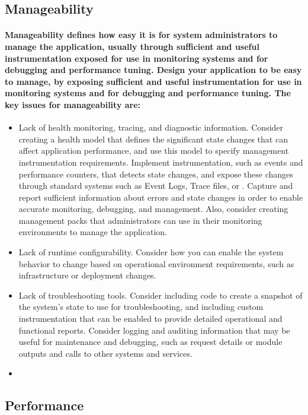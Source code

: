 \documentclass[../Psychological_system_web_application.tex]{subfiles}
\begin{document}
			\subsection{Manageability}
			
				\paragraph{\gls{Manageability} defines how easy it is for system administrators to manage the application, usually through sufficient and useful instrumentation exposed for use in monitoring systems and for debugging and performance tuning. Design your application to be easy to manage, by exposing sufficient and useful instrumentation for use in monitoring systems and for debugging and performance tuning. The key issues for manageability are:}
				
				\begin{itemize}
					\item
						Lack of health monitoring, tracing, and diagnostic information. Consider creating a health model that defines the significant state changes that can affect application performance, and use this model to specify management instrumentation requirements. Implement instrumentation, such as events and performance counters, that detects state changes, and expose these changes through standard systems such as Event Logs, Trace files, or . Capture and report sufficient information about errors and state changes in order to enable accurate monitoring, debugging, and management. Also, consider creating management packs that administrators can use in their monitoring environments to manage the application.
					\item
						Lack of runtime configurability. Consider how you can enable the system behavior to change based on operational environment requirements, such as infrastructure or deployment changes.
					\item
						Lack of troubleshooting tools. Consider including code to create a snapshot of the system’s state to use for troubleshooting, and including custom instrumentation that can be enabled to provide detailed operational and functional reports. Consider logging and auditing information that may be useful for maintenance and debugging, such as request details or module outputs and calls to other systems and services.
					\item
				\end{itemize}
			
			\subsection{Performance}
				
\end{document}
